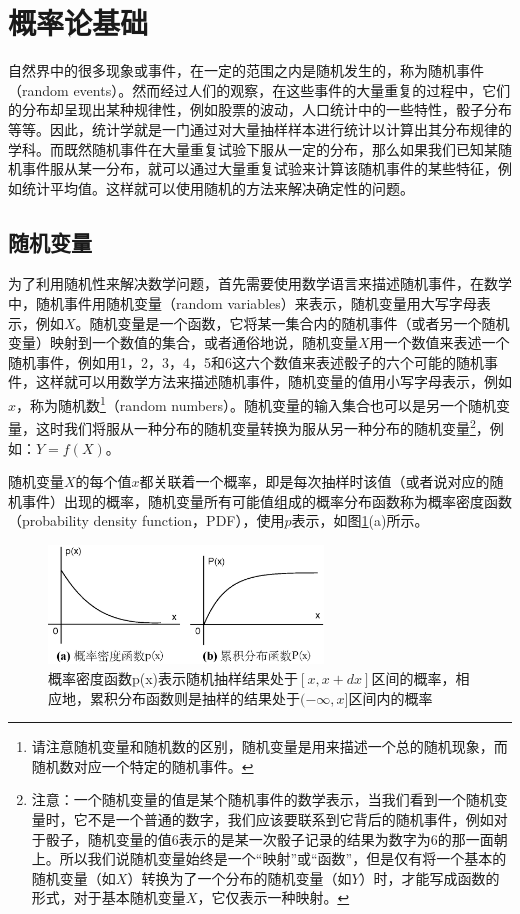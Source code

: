 \section{概率论基础}\label{sec:mc-probability}
自然界中的很多现象或事件，在一定的范围之内是随机发生的，称为随机事件（random events）。然而经过人们的观察，在这些事件的大量重复的过程中，它们的分布却呈现出某种规律性，例如股票的波动，人口统计中的一些特性，骰子分布等等。因此，统计学就是一门通过对大量抽样样本进行统计以计算出其分布规律的学科。而既然随机事件在大量重复试验下服从一定的分布，那么如果我们已知某随机事件服从某一分布，就可以通过大量重复试验来计算该随机事件的某些特征，例如统计平均值。这样就可以使用随机的方法来解决确定性的问题。




\subsection{随机变量}
为了利用随机性来解决数学问题，首先需要使用数学语言来描述随机事件，在数学中，随机事件用随机变量（random variables）来表示，随机变量用大写字母表示，例如$X$。随机变量是一个函数，它将某一集合内的随机事件（或者另一个随机变量）映射到一个数值的集合，或者通俗地说，随机变量$X$用一个数值来表述一个随机事件，例如用1，2，3，4，5和6这六个数值来表述骰子的六个可能的随机事件，这样就可以用数学方法来描述随机事件，随机变量的值用小写字母表示，例如$x$，称为随机数\footnote{请注意随机变量和随机数的区别，随机变量是用来描述一个总的随机现象，而随机数对应一个特定的随机事件。}（random numbers）。随机变量的输入集合也可以是另一个随机变量，这时我们将服从一种分布的随机变量转换为服从另一种分布的随机变量\footnote{注意：一个随机变量的值是某个随机事件的数学表示，当我们看到一个随机变量时，它不是一个普通的数字，我们应该要联系到它背后的随机事件，例如对于骰子，随机变量的值6表示的是某一次骰子记录的结果为数字为6的那一面朝上。所以我们说随机变量始终是一个“映射”或“函数”，但是仅有将一个基本的随机变量（如$X$）转换为了一个分布的随机变量（如$Y$）时，才能写成函数的形式，对于基本随机变量$X$，它仅表示一种映射。}，例如：$Y=f(X)$。

随机变量$X$的每个值$x$都关联着一个概率，即是每次抽样时该值（或者说对应的随机事件）出现的概率，随机变量所有可能值组成的概率分布函数称为概率密度函数（probability density function，PDF），使用$p$表示，如图\ref{f:mc-cdf}(a)所示。

\begin{figure}
	\sidecaption
	\includegraphics[width=0.65\textwidth]{figures/mc/cdf}
	\caption{概率密度函数p(x)表示随机抽样结果处于$[x,x+dx]$区间的概率，相应地，累积分布函数则是抽样的结果处于$(-\infty,x]$区间内的概率}
	\label{f:mc-cdf}
\end{figure}

